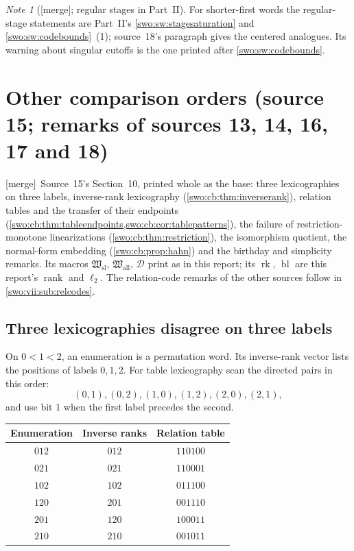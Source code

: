 \documentclass[11pt]{article}
\theoremstyle{definition}
\theoremstyle{remark}
\newtheorem{note}[note]{Note}
\newcommand{\rk}{\operatorname{rank}}
\newcommand{\bl}{\ell_2}
\newcommand{\merge}{\textsf{[merge]}}
\begin{document}
\begin{note}[\merge; regular stages in Part~II]\label{swo:vii:note:regular}
For shorter-first words the regular-stage statements are Part~II's
\cref{swo:sw:stagesaturation} and \cref{swo:sw:codebounds}~(1); source~18's
paragraph gives the centered analogues. Its warning about singular cutoffs is
the one printed after \cref{swo:sw:codebounds}.
\end{note}

\section{Other comparison orders (source 15; remarks of sources 13, 14, 16, 17 and 18)}\label{swo:cb:sec:alternatives}

\merge\ Source~15's Section~10, printed whole as the base: three
lexicographies on three labels, inverse-rank lexicography
(\cref{swo:cb:thm:inverserank}), relation tables and the transfer of their
endpoints (\cref{swo:cb:thm:tableendpoints,swo:cb:cor:tablepatterns}), the
failure of restriction-monotone linearizations (\cref{swo:cb:thm:restriction}),
the isomorphism quotient, the normal-form embedding
(\cref{swo:cb:prop:hahn}) and the birthday and simplicity remarks. Its
macros $\mathfrak W_{\mathrm{sl}}$, $\mathfrak W_{\mathrm{all}}$, $\mathcal D$
print as in this report; its $\operatorname{rk}$, $\operatorname{bl}$ are
this report's $\rk$ and $\bl$. The relation-code remarks of the other sources
follow in \cref{swo:vii:sub:relcodes}.

\subsection{Three lexicographies disagree on three labels}

On $0<1<2$, an enumeration is a permutation word. Its inverse-rank
vector lists the positions of labels $0,1,2$. For table lexicography
scan the directed pairs in this order:
\[
 (0,1),(0,2),(1,0),(1,2),(2,0),(2,1),
\]
and use bit $1$ when the first label precedes the second.

\begin{center}
\begin{tabular}{ccc}
\toprule Enumeration & Inverse ranks & Relation table\\\midrule
$012$ & $012$ & $110100$\\
$021$ & $021$ & $110001$\\
$102$ & $102$ & $011100$\\
$120$ & $201$ & $001110$\\
$201$ & $120$ & $100011$\\
$210$ & $210$ & $001011$\\\bottomrule
\end{tabular}
\end{center}
\end{document}
